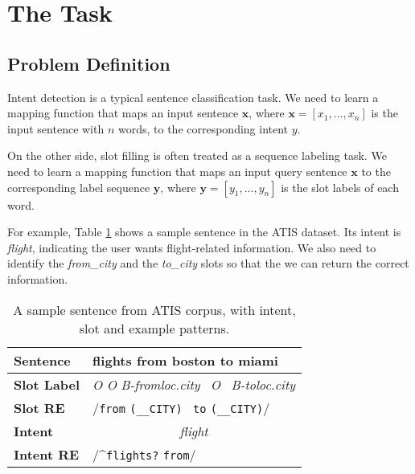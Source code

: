 \section{The Task}
\subsection{Problem Definition}
Intent detection is a typical sentence classification task.
We need to learn a mapping function that maps an input sentence $\textbf{x}$, where $\textbf{x}=[x_{1}, ..., x_{n}]$ is the input sentence with $n$ words, to the corresponding intent $y$.

On the other side, slot filling is often treated as a sequence labeling task.
We need to learn a mapping function that maps an input query sentence $\textbf{x}$ to the corresponding label sequence $\textbf{y}$, where $\textbf{y}=[y_{1}, ..., y_{n}]$ is the slot labels of each word.

For example, Table \ref{atis_sample} shows a sample sentence in the ATIS dataset. Its intent is \emph{flight}, indicating the user wants flight-related information. We also need to identify the \emph{from\_city} and the \emph{to\_city} slots so that the we can return the correct information.

\begin{table}
\setlength{\tabcolsep}{0.23em}
\centering
\small{
\begin{tabular}{|l|l|}

\hline
\textbf{Sentence} &flights \;\;\;\;\;\;\;\; from \;\;\;\; boston \;\;\;\;\; to \;\;\; miami  \\
\hline
\textbf{Slot Label} &\;\;\; \emph{O} \;\;\;\;\;\;\;\;\;\;\; \emph{O} \; \emph{B-fromloc.city} \, \emph{O} \, \emph{B-toloc.city} \\
\hline
\textbf{Slot RE} & \multicolumn{1}{|l|}{\quad\quad\quad\;\;\;\;\;\;/\texttt{from} \; \texttt{(\_\_CITY)} \, \texttt{to}  \texttt{(\_\_CITY)}/} \\
\hline
\textbf{Intent} &\multicolumn{1}{|c|}{\emph{flight}} \\
\hline
\textbf{Intent RE} & \multicolumn{1}{|l|}{/\textasciicircum \texttt{flights?} \texttt{from}/} \\
\hline
\end{tabular}
}
\caption{A sample sentence from ATIS corpus, with intent, slot and example \RE patterns.}
\label{atis_sample}
\end{table}


